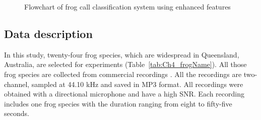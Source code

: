 \begin{figure}[htb!] %
\caption{Flowchart of frog call classification system using enhanced features}
\label{fig:Ch4_flowchart} 
\end{figure}


\subsection{Data description}
In this study, twenty-four frog species, which are widespread in Queensland, Australia, are selected for experiments (Table~\ref{tab:Ch4_frogName}). 
All those frog species are collected from commercial recordings \citep{CD}. All the recordings are two-channel, sampled at 44.10 kHz and saved in MP3 format. All recordings were obtained with a directional microphone and have a high SNR. Each recording includes one frog species with the duration ranging from eight to fifty-five seconds.

